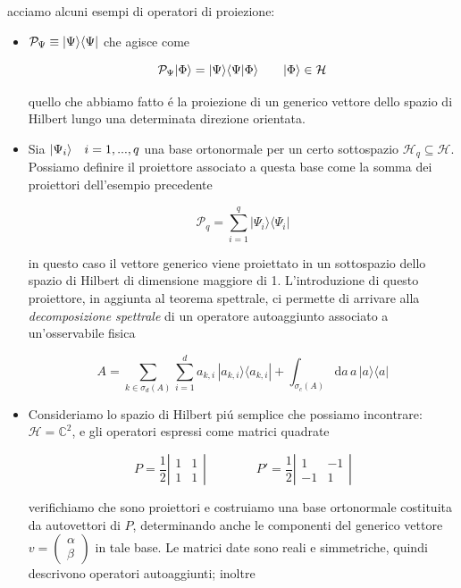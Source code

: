 acciamo alcuni esempi di operatori di proiezione:
\begin{itemize}
	\item $\mathcal{P}_\Psi \equiv \ket{\Psi}\bra{\Psi}$ che agisce come 
	
	$$\mathcal{P}_\Psi \ket{\Phi} = \ket{\Psi} \braket{\Psi}{\Phi} \qquad \ket{\Phi} \in \mathcal{H}$$
	
	quello che abbiamo fatto \'e la proiezione di un generico vettore dello spazio di Hilbert lungo una determinata direzione orientata.

	\item Sia $\ket{\Psi_i} \quad i = {1,...,q}$ una base ortonormale per un certo sottospazio $\mathcal{H}_q \subseteq \mathcal{H}$. Possiamo definire il proiettore associato a questa base come la somma dei proiettori dell'esempio precedente

	$${\mathcal{P}}_{q}=\sum_{i=1}^{q}|\Psi_{i}\rangle\!\langle\Psi_{i}|$$

	in questo caso il vettore generico viene proiettato in un sottospazio dello spazio di Hilbert di dimensione maggiore di 1. L'introduzione di questo proiettore, in aggiunta al teorema spettrale, ci permette di arrivare alla \textit{decomposizione spettrale} di un operatore autoaggiunto associato a un'osservabile fisica

	\begin{equation}
		A=\sum_{k\in\sigma_{d}(A)}\sum_{i=1}^{d}a_{k,i}\,|a_{k,i}\rangle\!\langle a_{k,i}|+\int_{\sigma_{c}(A)}\mathrm{d}a\,a\,|a\rangle\!\langle a|
	\end{equation}

	\item Consideriamo lo spazio di Hilbert pi\'u semplice che possiamo incontrare: $\mathcal{H} = \mathbb{C}^2$, e gli operatori espressi come matrici quadrate

	$$ P=\frac{1}{2}\left|\begin{array}{ccc}1&1\\ 1&1\end{array}\right|\qquad\qquad P'=\frac{1}{2}\left|\begin{array}{ccc}1&-1\\ -1&1\end{array}\right|$$  

	verifichiamo che sono proiettori e costruiamo una base ortonormale costituita da autovettori di $P$, determinando anche le componenti del generico vettore $v = \left( \begin{array}{c} \alpha \\ \beta\end{array} \right)$ in tale base.
	Le matrici date sono reali e simmetriche, quindi descrivono operatori autoaggiunti; inoltre


\end{itemize}
